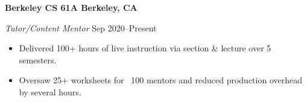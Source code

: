 \textbf{Berkeley CS 61A \hfill Berkeley, CA} \par
\textit{Tutor/Content Mentor} \hfill Sep 2020--Present \par
\begin{itemize}
	\item Delivered 100+ hours of live instruction via section \& lecture over 5 semesters.
	\item Oversaw 25+ worksheets for ~100 mentors and reduced production overhead by several hours.
\end{itemize}\par